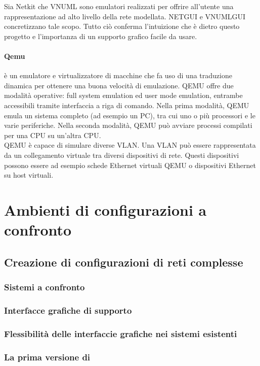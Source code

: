 Sia Netkit che VNUML sono emulatori realizzati per offrire all'utente una rappresentazione ad alto livello della rete modellata. NETGUI e VNUMLGUI concretizzano tale scopo. Tutto ciò conferma l'intuizione che è dietro questo progetto e l'importanza di un supporto grafico facile da usare.

\paragraph{Qemu}\cite{QUATC05} è un emulatore e virtualizzatore di macchine che fa uso di una traduzione dinamica per ottenere una buona velocità di emulazione. QEMU offre due modalità operative: full system emulation ed user mode emulation, entrambe accessibili tramite interfaccia a riga di comando. Nella prima modalità, QEMU emula un sistema completo (ad esempio un PC), tra cui uno o più processori e le varie periferiche. Nella seconda modalità, QEMU può avviare processi compilati per una CPU su un'altra CPU.\\
QEMU è capace di simulare diverse VLAN. Una VLAN può essere rappresentata da un collegamento virtuale tra diversi dispositivi di rete. Questi dispositivi possono essere ad esempio schede Ethernet virtuali QEMU o dispositivi Ethernet su host virtuali.\\

\section{Ambienti di configurazioni a confronto}

\subsection{Creazione di configurazioni di reti complesse}

\subsubsection{Sistemi a confronto}

\subsubsection{Interfacce grafiche di supporto}

\subsubsection{Flessibilità delle interfaccie grafiche nei sistemi esistenti}

\subsubsection{La prima versione di \visualnetkit{}}


